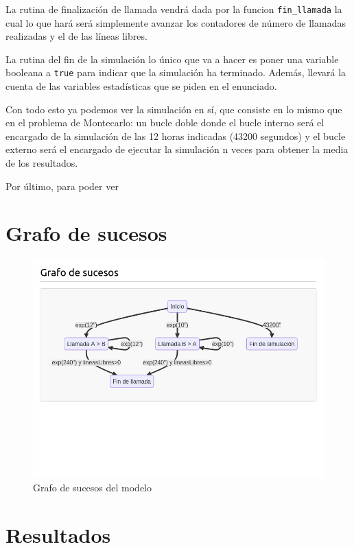 \documentclass[11pt,a4paper]{report}
\begin{document}
La rutina de finalización de llamada vendrá dada por la funcion \texttt{fin\_llamada} la cual lo que hará será simplemente avanzar los contadores de número de llamadas realizadas y el de las líneas libres.

La rutina del fin de la simulación lo único que va a hacer es poner una variable booleana a \texttt{true} para indicar que la simulación ha terminado. Además, llevará la cuenta de las variables estadísticas que se piden en el enunciado.

Con todo esto ya podemos ver la simulación en sí, que consiste en lo mismo que en el problema de Montecarlo: un bucle doble donde el bucle interno será el encargado de la simulación de las 12 horas indicadas (43200 segundos) y el bucle externo será el encargado de ejecutar la simulación n veces para obtener la media de los resultados.

Por último, para poder ver 

\section{Grafo de sucesos}

\begin{figure}[H]
\centering
\includegraphics[width=\textwidth]{img/grafo_sucesos.png}
\caption{Grafo de sucesos del modelo}
\label{}
\end{figure}

\section{Resultados}
\end{document}
